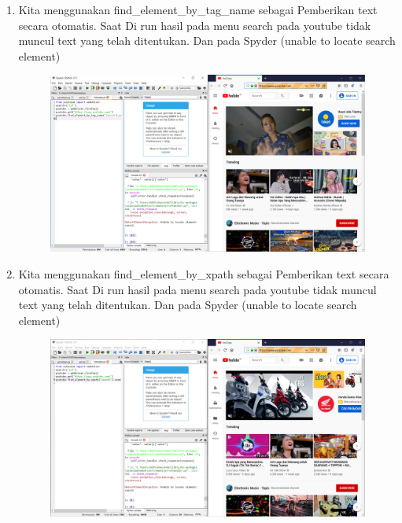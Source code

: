 \begin{enumerate}
    \item Kita menggunakan find\_element\_by\_tag\_name sebagai Pemberikan text secara otomatis. Saat  Di run hasil pada menu search pada youtube tidak muncul text yang telah ditentukan. Dan pada Spyder {(unable to locate search element)}
\begin{figure}[!htbp]
    \centering
    \includegraphics[scale=0.3]{figure/hasilTes/7.png}
    \label{gambar 1}
\end{figure}

\vspace{6cm}
    
    \item Kita menggunakan find\_element\_by\_xpath sebagai Pemberikan text secara otomatis. Saat  Di run hasil pada menu search pada youtube tidak muncul text yang telah ditentukan. Dan pada Spyder {(unable to locate search element)}
\begin{figure}[!htbp]
    \centering
    \includegraphics[scale=0.3]{figure/hasilTes/8.png}
    \label{gambar 1}
\end{figure}


\end{enumerate}
